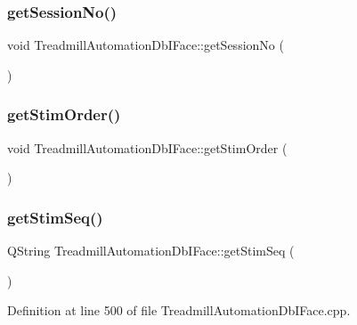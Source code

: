 \subsubsection{\texorpdfstring{get\+Session\+No()}{getSessionNo()}}
{\footnotesize\ttfamily void Treadmill\+Automation\+Db\+I\+Face\+::get\+Session\+No (\begin{DoxyParamCaption}{ }\end{DoxyParamCaption})}

\mbox{\label{class_treadmill_automation_db_i_face_a9d15e9f80ec5eb6e332264cf72cfb170}} 
\subsubsection{\texorpdfstring{get\+Stim\+Order()}{getStimOrder()}}
{\footnotesize\ttfamily void Treadmill\+Automation\+Db\+I\+Face\+::get\+Stim\+Order (\begin{DoxyParamCaption}{ }\end{DoxyParamCaption})}

\mbox{\label{class_treadmill_automation_db_i_face_aba0e5950a23549b5d042368d9e651790}} 
\subsubsection{\texorpdfstring{get\+Stim\+Seq()}{getStimSeq()}}
{\footnotesize\ttfamily Q\+String Treadmill\+Automation\+Db\+I\+Face\+::get\+Stim\+Seq (\begin{DoxyParamCaption}{ }\end{DoxyParamCaption})}



Definition at line 500 of file Treadmill\+Automation\+Db\+I\+Face.\+cpp.

